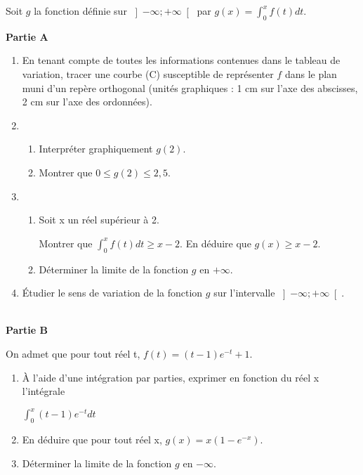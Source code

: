 Soit $g$ la fonction définie sur $\left]-\infty ; +\infty \right[$ par $g\left(x\right)=\int_{0}^{x}f\left(t\right)dt$.
\par
\textbf{Partie A}
\begin{enumerate}
     \item
     En tenant compte de toutes les informations contenues dans le tableau de variation, tracer une courbe (C) susceptible de représenter $f$ dans le plan muni d'un repère orthogonal (unités graphiques : 1 cm sur l'axe des abscisses, 2 cm sur l'axe des ordonnées).
     \item
     \begin{enumerate}[label=\alph*.]
          \item
          Interpréter graphiquement $g\left(2\right)$.
          \item
          Montrer que $0 \leqslant g\left(2\right) \leqslant 2,5$.
     \end{enumerate}
     \item
     \begin{enumerate}[label=\alph*.]
          \item
          Soit x un réel supérieur à 2.
          \par
          Montrer que  $\int_{0}^{x}f\left(t\right)dt\geqslant x-2$. En déduire que $g\left(x\right) \geqslant x-2$.
          \item
          Déterminer la limite de la fonction $g$ en $+\infty $.
     \end{enumerate}
     \item
     Étudier le sens de variation de la fonction $g$ sur l'intervalle $\left]-\infty  ;+\infty  \right[$.
\end{enumerate}
\\
\textbf{Partie B}
\par
On admet que pour tout réel t, $f\left(t\right)=\left(t -1\right)e^{-t} +1$.
\begin{enumerate}
     \item
     À l'aide d'une intégration par parties, exprimer en fonction du réel x l'intégrale
     \par
     $\int_{0}^{x}\left(t -1\right)e^{-t}dt$
     \item
     En déduire que pour tout réel x, $g\left(x\right)=x\left(1-e^{-x}\right)$.
     \item
Déterminer la limite de la fonction $g$ en $-\infty $.\end{enumerate}
